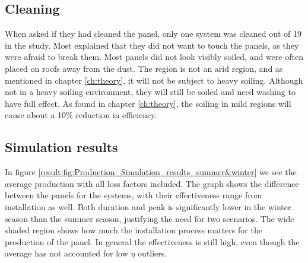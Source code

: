 \subsection{Cleaning}
When asked if they had cleaned the panel, only one system was cleaned out of 19 in the study. Most explained that they did not want to touch the panels, as they were afraid to break them. Most panels did not look visibly soiled, and were often placed on roofs away from the dust. The region is not an arid region, and as mentioned in chapter \ref{ch:theory}, it will not be subject to heavy soiling. Although not in a heavy soiling environment, they will still be soiled and need washing to have full effect. As found in chapter \ref{ch:theory}, the soiling in mild regions will cause about a 10\% reduction in efficiency. 

\subsection{Simulation results}
In figure \ref{result:fig:Production_Simulation_results_summer&winter} we see the average production with all loss factors included. The graph shows the difference between the panels for the systems, with their effectiveness range from installation as well. Both duration and peak is significantly lower in the winter season than the summer season, justifying the need for two scenarios. The wide shaded region shows how much the installation process matters for the production of the panel. In general the effectiveness is still high, even though the average has not accounted for low $\eta$ outliers. 

